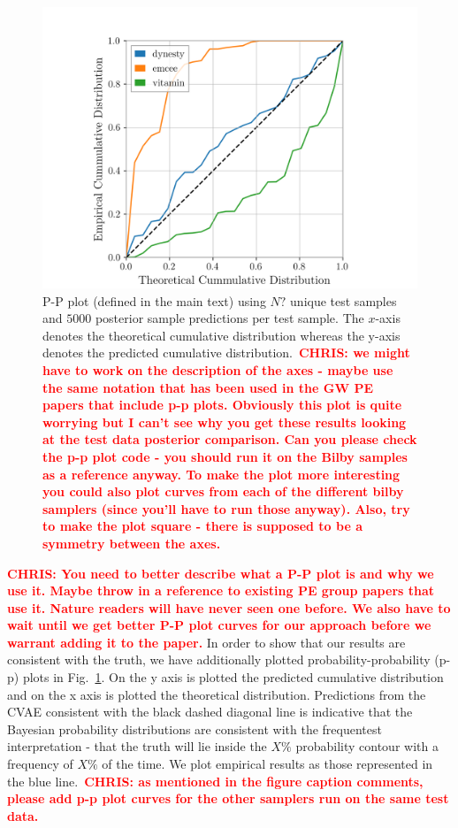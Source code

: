 \documentclass[%
showpacs,
 amsmath,amssymb,
 aps,
 twocolumn,
 prl,
 reprint,
floatfix,
]{revtex4-1}
\newcommand{\chris}[1]{\textbf{\textcolor{red}{CHRIS: #1}}}
\begin{document}
%
%
\begin{figure}
    \includegraphics[width=\columnwidth]{images/latest_pp_plot.png}
    \caption{\label{fig:pp_plot} P-P plot (defined in the main text) using $N?$
unique test samples and $5000$ posterior sample predictions per test sample.
The $x$-axis denotes the theoretical cumulative distribution whereas the y-axis
denotes the predicted cumulative distribution.~\chris{we might have to work on
the description of the axes - maybe use the same notation that has been used in
the GW PE papers that include p-p plots. Obviously this plot is quite worrying
but I can't see why you get these results looking at the test data posterior
comparison. Can you please check the p-p plot code - you should run it on the
Bilby samples as a reference anyway. To make the plot more interesting you
could also plot curves from each of the different bilby samplers (since you'll
have to run those anyway). Also, try to make the plot square - there is
supposed to be a symmetry between the axes.}}
\end{figure}
%

%
%
\chris{You need to better describe what a P-P plot is and why we use it. Maybe
throw in a reference to existing PE group papers that use it. Nature readers
will have never seen one before. We also have to wait until we get better P-P
plot curves for our approach before we warrant adding it to the paper.} In
order to show that our results are consistent with the truth, we have
additionally plotted probability-probability (p-p) plots in
Fig.~\ref{fig:pp_plot}. On the y axis is plotted the predicted cumulative
distribution and on the x axis is plotted the theoretical distribution.
Predictions from the \ac{CVAE} consistent with the black dashed diagonal line
is indicative that the Bayesian probability distributions are consistent with
the frequentest interpretation - that the truth will lie inside the $X\%$
probability contour with a frequency of $X\%$ of the time.  We plot empirical
results as those represented in the blue line.~\chris{as mentioned in the
figure caption comments, please add p-p plot curves for the other samplers run
on the same test data.} 
\end{document}
